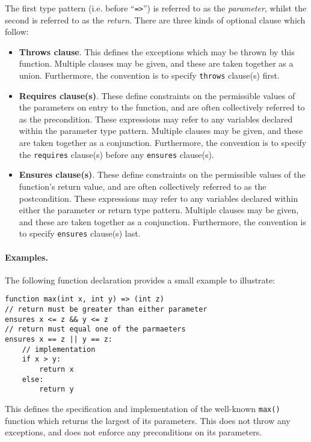 The first type pattern (i.e. before ``\lstinline{=>}'') is referred to as the {\em parameter}, whilst the second is referred to as the {\em return}.  There are three kinds of optional clause which follow:

\begin{itemize}
\item {\bf Throws clause}. This defines the exceptions which may be thrown by this function. Multiple clauses may be given, and these are taken together as a union. Furthermore, the convention is to specify \lstinline{throws} clause(s) first.

\item {\bf Requires clause(s)}. These define constraints on the permissible values of the parameters on entry to the function, and are often collectively referred to as the \gls{precondition}. These expressions may refer to any variables declared within the parameter type pattern. Multiple clauses may be given, and these are taken together as a conjunction. Furthermore, the convention is to specify the \lstinline{requires} clause(s) before any \lstinline{ensures} clause(s).

\item {\bf Ensures clause(s)}. These define constraints on the permissible values of the function's return value, and are often collectively referred to as the \gls{postcondition}. These expressions may refer to any variables declared within either the parameter or return type pattern.  Multiple clauses may be given, and these are taken together as a conjunction. Furthermore, the convention is to specify \lstinline{ensures} clause(s) last.
\end{itemize}

\paragraph{Examples.}
The following function declaration provides a small example to
illustrate:

\begin{lstlisting}
function max(int x, int y) => (int z)
// return must be greater than either parameter
ensures x <= z && y <= z
// return must equal one of the parmaeters
ensures x == z || y == z:
    // implementation
    if x > y:
        return x
    else:
        return y
\end{lstlisting}

This defines the specification and implementation of the well-known
\lstinline{max()} function which returns the largest of its
parameters. This does not throw any exceptions, and does not enforce
any preconditions on its parameters.


